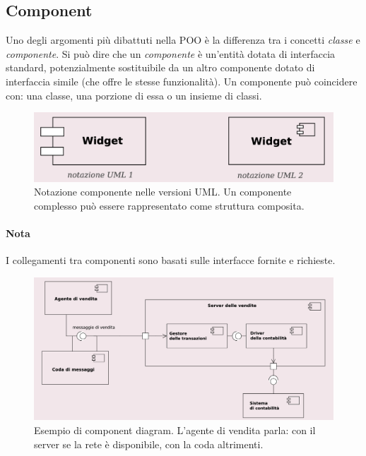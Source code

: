 \subsection{Component}

Uno degli argomenti più dibattuti nella POO è la differenza tra i concetti \textit{classe} e \textit{componente}. Si può dire che un \textit{componente} è un'entità dotata di interfaccia standard, potenzialmente sostituibile da un altro componente dotato di interfaccia simile (che offre le stesse funzionalità). Un componente può coincidere con: una classe, una porzione di essa o un insieme di classi.

\begin{figure}[H]
    \centering
    \includegraphics[width=0.75\linewidth]{assets/UML/component/component-1.png}
    \caption{Notazione componente nelle versioni UML. Un componente complesso può essere rappresentato come struttura composita.}
\end{figure}

\paragraph{Nota} I collegamenti tra componenti sono basati sulle interfacce fornite e richieste.

\begin{figure}[H]
    \centering
    \includegraphics[width=0.75\linewidth]{assets/UML/component/component-2.png}
    \caption{Esempio di component diagram. L'agente di vendita parla: con il server se la rete è disponibile, con la coda altrimenti.}
\end{figure}

\newpage